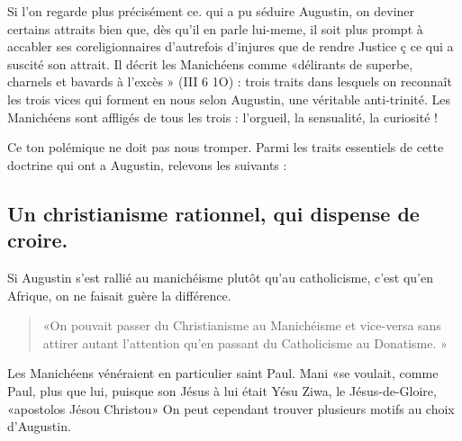  
Si l'on regarde plus précisément ce. qui a	pu séduire Augustin, on deviner certains attraits bien que, dès qu'il en parle lui-meme, il soit plus prompt à accabler ses coreligionnaires d'autrefois  d'injures que de rendre Justice ç ce qui a suscité son attrait.
Il décrit les Manichéens comme «délirants de superbe, charnels et bavards à l'excès » (III 6 1O) : trois traits dans lesquels on reconnaît	les trois
vices qui forment en nous selon Augustin, une véritable anti-trinité. Les Manichéens sont affligés de tous les trois : l'orgueil, la sensualité, la curiosité ! 
 
Ce ton polémique ne doit pas nous tromper. Parmi les traits essentiels de cette doctrine qui ont a Augustin, relevons les suivants :

\subsection{Un  christianisme  rationnel,  qui  dispense  de croire.}

Si Augustin s'est rallié au manichéisme plutôt qu'au catholicisme, c'est qu'en Afrique, on ne faisait guère la différence.
\begin{quote}
    «On pouvait passer du Christianisme au Manichéisme et vice-versa sans attirer autant l'attention qu'en passant du Catholicisme au Donatisme. »
\end{quote} 

Les Manichéens vénéraient en particulier saint Paul. Mani «se voulait, comme Paul, plus que lui, puisque son Jésus à lui était Yésu Ziwa, le Jésus-de-Gloire, «apostolos Jésou Christou»   On peut cependant trouver plusieurs motifs au choix d'Augustin.

